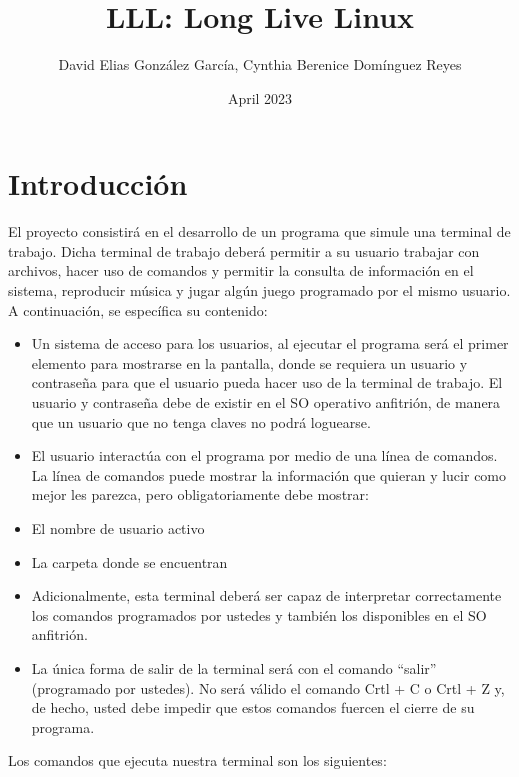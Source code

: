 \documentclass[titlepage]{article}
\title{LLL: Long Live Linux}
\author{David Elias González García, Cynthia Berenice Domínguez Reyes}
\date{April 2023}
\begin{document}
\maketitle
\tableofcontents
\pagebreak
\section{Introducción}
El proyecto consistirá en el desarrollo de un programa que simule una terminal de trabajo. Dicha  terminal de trabajo deberá permitir a su usuario trabajar con archivos, hacer uso de comandos y  permitir la consulta de información en el sistema, reproducir música y jugar algún juego  programado por el mismo usuario. A continuación, se específica su contenido: \\
\begin{itemize}
\item Un sistema de acceso para los usuarios, al ejecutar el programa será el primer elemento para  mostrarse en la pantalla, donde se requiera un usuario y contraseña para que el usuario pueda  hacer uso de la terminal de trabajo. El usuario y contraseña debe de existir en el SO operativo  anfitrión, de manera que un usuario que no tenga claves no podrá loguearse. 
\item El usuario interactúa con el programa por medio de una línea de comandos. La línea de comandos puede mostrar la información que quieran y lucir como mejor les parezca, pero  obligatoriamente debe mostrar: 
    \item El nombre de usuario activo 
    \item La carpeta donde se encuentran 
\item Adicionalmente, esta terminal deberá ser capaz de interpretar correctamente los comandos programados por ustedes y también los disponibles en el SO anfitrión. 
\item La única forma de  salir de la terminal será con el comando “salir” (programado por ustedes). No será válido el  comando Crtl + C o Crtl + Z y, de hecho, usted debe impedir que estos comandos fuercen el  cierre de su programa.

\end{itemize}
Los comandos que ejecuta nuestra terminal son los siguientes:
\end{document}
